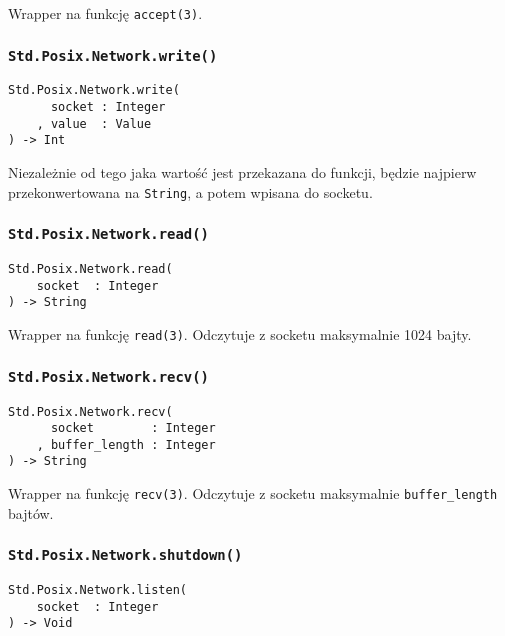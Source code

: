 Wrapper na funkcję \texttt{accept(3)}.

\subsubsection{\texttt{Std.Posix.Network.write()}}

\begin{small}
\begin{lstlisting}
Std.Posix.Network.write(
      socket : Integer
    , value  : Value
) -> Int
\end{lstlisting}
\end{small}

Niezależnie od tego jaka wartość jest przekazana do funkcji, będzie najpierw przekonwertowana na
\texttt{String}, a potem wpisana do socketu.

\subsubsection{\texttt{Std.Posix.Network.read()}}

\begin{small}
\begin{lstlisting}
Std.Posix.Network.read(
    socket  : Integer
) -> String
\end{lstlisting}
\end{small}

Wrapper na funkcję \texttt{read(3)}. Odczytuje z socketu maksymalnie 1024 bajty.

\subsubsection{\texttt{Std.Posix.Network.recv()}}

\begin{small}
\begin{lstlisting}
Std.Posix.Network.recv(
      socket        : Integer
    , buffer_length : Integer
) -> String
\end{lstlisting}
\end{small}

Wrapper na funkcję \texttt{recv(3)}. Odczytuje z socketu maksymalnie \texttt{buffer\_length} bajtów.

\subsubsection{\texttt{Std.Posix.Network.shutdown()}}

\begin{small}
\begin{lstlisting}
Std.Posix.Network.listen(
    socket  : Integer
) -> Void
\end{lstlisting}
\end{small}

